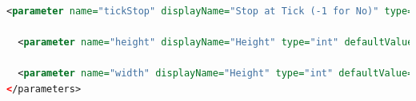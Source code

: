 \begin{appendices}
\begin{lstlisting}[language=XML, caption={Example params.xml file for a Repast simulation}]
  <parameter name="tickStop" displayName="Stop at Tick (-1 for No)" type="int" defaultValue="15552000" isReadOnly="false" converter="repast.simphony.parameter.StringConverterFactory$IntConverter"/>
    
  <parameter name="height" displayName="Height" type="int" defaultValue="1200" isReadOnly="false" converter="repast.simphony.parameter.StringConverterFactory$IntConverter" />
  
  <parameter name="width" displayName="Height" type="int" defaultValue="1200" isReadOnly="false" converter="repast.simphony.parameter.StringConverterFactory$IntConverter" />
</parameters>
\end{lstlisting}

\end{appendices}